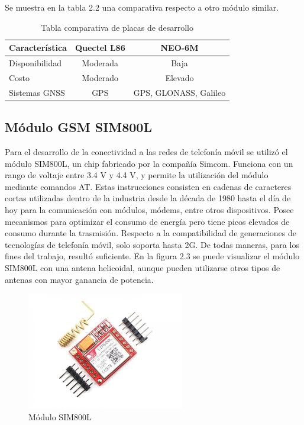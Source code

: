Se muestra en la tabla 2.2 una comparativa respecto a otro módulo similar.

\begin{table}[h]
	\centering
	\caption[Tabla comparativa]{Tabla comparativa de placas de desarrollo}
	\begin{tabular}{l c c}    
		\toprule
		\textbf{Característica} 	 & \textbf{Quectel L86} & \textbf{NEO-6M} \\
		\midrule
		Disponibilidad & Moderada & Baja			\\		
		Costo & Moderado & Elevado			\\
		Sistemas GNSS & GPS & GPS, GLONASS, Galileo		\\
		\bottomrule
		\hline
	\end{tabular}
	\label{tab:peces}
\end{table}

\subsection{Módulo GSM SIM800L}

Para el desarrollo de la conectividad a las redes de telefonía móvil se utilizó el módulo SIM800L, un chip fabricado por la compañía Simcom. Funciona con un rango de voltaje entre 3.4 V y 4.4 V, y permite la utilización del módulo mediante comandos AT. Estas instrucciones consisten en cadenas de caracteres cortas utilizadas dentro de la industria desde la década de 1980 hasta el día de hoy para la comunicación con módulos, módems, entre otros dispositivos{\citep{AT:1}}. Posee mecanismos para optimizar el consumo de energía pero tiene picos elevados de consumo durante la trasmisión. Respecto a la compatibilidad de generaciones de tecnologías de telefonía móvil, solo soporta hasta 2G\citep{SIM800L:1}. De todas maneras, para los fines del trabajo, resultó suficiente. En la figura 2.3 se puede visualizar el módulo SIM800L con una antena helicoidal, aunque pueden utilizarse otros tipos de antenas con mayor ganancia de potencia.

\begin{figure}[H]
	\centering
	\includegraphics[width=.6\textwidth]{./Figures/sim800l.jpg}
	\caption{Módulo SIM800L}
	\label{fig:texmaker}
\end{figure}

